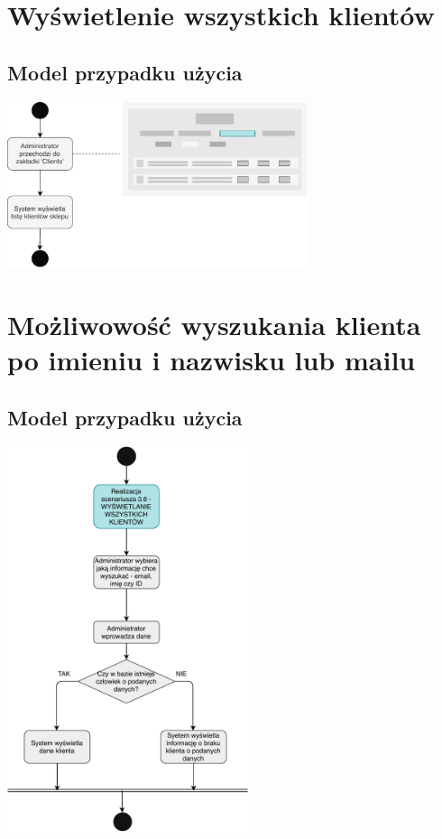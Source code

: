 \documentclass[12pt]{report}
\begin{document}
		
	\section{Wyświetlenie wszystkich klientów}
		\subsection{Model przypadku użycia}
			\begin{center}
				\includegraphics[width=250pt]{klienci.pdf}
			\end{center}
			
		
	\section{Możliwowość wyszukania klienta po imieniu i nazwisku lub mailu}
		\subsection{Model przypadku użycia}
			\begin{center}
				\includegraphics[width=200pt]{szukaj_klienta.pdf}
			\end{center}
		
\end{document}
